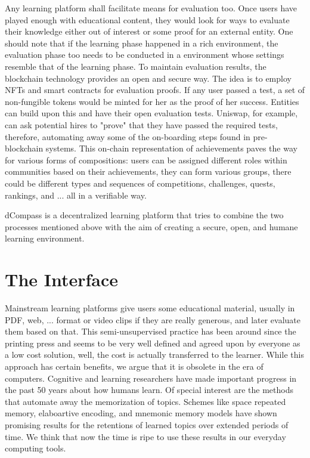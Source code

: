 \documentclass[12pt, a4paper]{article}
\begin{document}
Any learning platform shall facilitate means for evaluation too. Once users have played enough with  educational content, they would look for ways to evaluate their knowledge either out of interest or some proof for an external entity. One should note that if the learning phase happened in a rich environment, the evaluation phase too needs to be conducted in a environment whose settings resemble that of the learning phase. To maintain evaluation results, the blockchain technology provides an open and secure way. The idea is to employ NFTs and smart contracts for evaluation proofs. If any user passed a test, a set of non-fungible tokens would be minted for her as the proof of her success. Entities can build upon this and have their open evaluation tests. Uniswap, for example, can ask potential hires to "prove" that they have passed the required tests, therefore, automating away some of the on-boarding steps found in pre-blockchain systems. This on-chain representation of achievements paves the way for various forms of compositions: users can be assigned different roles within communities based on their achievements, they can form various groups, there could be different types and sequences of competitions, challenges, quests, rankings, and ... all in a verifiable way.

dCompass is a decentralized learning platform that tries to combine the two processes mentioned above with the aim of creating a secure, open, and humane learning environment.

\section*{The Interface}
Mainstream learning platforms give users some educational material, usually in PDF, web, ... format or video clips if they are really generous, and later evaluate them based on that. This semi-unsupervised practice has been around since the printing press and seems to be very well defined and agreed upon by everyone as a low cost solution, well, the cost is actually transferred to the learner. While this approach has certain benefits, we argue that it is obsolete in the era of computers. Cognitive and learning researchers have made important progress in the past 50 years about how humans learn. Of special interest are the methods that automate away the memorization of topics. Schemes like space repeated memory, elaboartive encoding, and mnemonic memory models have shown promising results for the retentions of learned topics over extended periods of time. We think that now the time is ripe to use these results in our everyday computing tools.
\end{document}
